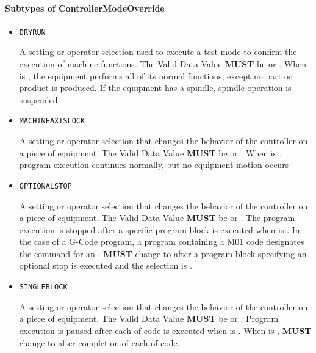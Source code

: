 \FloatBarrier

\paragraph{Subtypes of ControllerModeOverride}\mbox{}
\label{sec:Subtypes of ControllerModeOverride}

\begin{itemize}

\item \texttt{DRY\textunderscore RUN}


A setting or operator selection used to execute a test mode to confirm the execution of machine functions. 
 The \gls{Valid Data Value} \textbf{MUST} be  or . 
 When  is , the equipment performs all of its normal functions, except no part or product is produced.  If the equipment has a spindle, spindle operation is suspended.

\item \texttt{MACHINE\textunderscore AXIS\textunderscore LOCK}


A setting or operator selection that changes the behavior of the controller on a piece of equipment. 
 The \gls{Valid Data Value} \textbf{MUST} be  or . 
 When  is , program execution continues normally, but no equipment motion occurs 

\item \texttt{OPTIONAL\textunderscore STOP}


A setting or operator selection that changes the behavior of the controller on a piece of equipment. 
 The \gls{Valid Data Value} \textbf{MUST} be  or .
 The program execution is stopped after a specific program block is executed when  is .    
 In the case of a G-Code program, a program  containing a M01 code designates the command for an . 
  \textbf{MUST} change to  after a program block specifying an optional stop is executed and the  selection is .

\item \texttt{SINGLE\textunderscore BLOCK}


A setting or operator selection that changes the behavior of the controller on a piece of equipment. 
 The \gls{Valid Data Value} \textbf{MUST} be  or .
 Program execution is paused after each  of code is executed when  is .   
 When  is ,  \textbf{MUST} change to  after completion of each  of code. 


\end{itemize}
